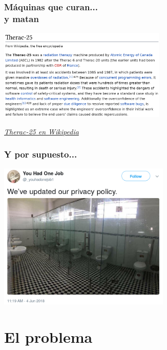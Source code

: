 \documentclass[17pt,aspectratio=169]{beamer}
\begin{document}
\begin{frame}[fragile]
\frametitle{Máquinas que curan... \\ y matan}

  \begin{center}
  \includegraphics[width=8cm]{figs/therac-25}
  \end{center}

  \begin{flushright}
    {\em \tiny
      \href{https://en.wikipedia.org/wiki/Therac-25}{Therac-25 en Wikipedia}}
  \end{flushright}
  
\end{frame}


\begin{frame}
\frametitle{Y por supuesto...}

\begin{center}
\includegraphics[height=7cm]{figs/privacy-policy-wc}
\end{center}

\end{frame}

\section{El problema}
\end{document}
